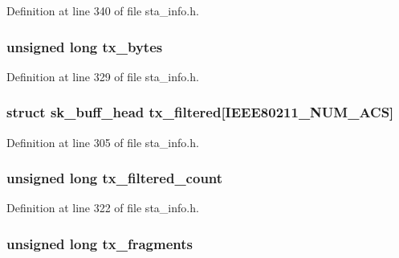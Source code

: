 Definition at line 340 of file sta\-\_\-info.\-h.

\hypertarget{structsta__info_a7639b5284b79992ec806f00466ee1f24}{
\subsubsection[{tx\-\_\-bytes}]{\setlength{\rightskip}{0pt plus 5cm}unsigned long tx\-\_\-bytes}}\label{structsta__info_a7639b5284b79992ec806f00466ee1f24}


Definition at line 329 of file sta\-\_\-info.\-h.

\hypertarget{structsta__info_a11b1213a5b6c2d45b8e5e4526ac01620}{
\subsubsection[{tx\-\_\-filtered}]{\setlength{\rightskip}{0pt plus 5cm}struct sk\-\_\-buff\-\_\-head tx\-\_\-filtered\mbox{[}I\-E\-E\-E80211\-\_\-\-N\-U\-M\-\_\-\-A\-C\-S\mbox{]}}}\label{structsta__info_a11b1213a5b6c2d45b8e5e4526ac01620}


Definition at line 305 of file sta\-\_\-info.\-h.

\hypertarget{structsta__info_a4ea3ebbcb6af9d8f4f401897d2d16f13}{
\subsubsection[{tx\-\_\-filtered\-\_\-count}]{\setlength{\rightskip}{0pt plus 5cm}unsigned long tx\-\_\-filtered\-\_\-count}}\label{structsta__info_a4ea3ebbcb6af9d8f4f401897d2d16f13}


Definition at line 322 of file sta\-\_\-info.\-h.

\hypertarget{structsta__info_ad4530b03477a3a0603c240e67c163ab9}{
\subsubsection[{tx\-\_\-fragments}]{\setlength{\rightskip}{0pt plus 5cm}unsigned long tx\-\_\-fragments}}\label{structsta__info_ad4530b03477a3a0603c240e67c163ab9}



